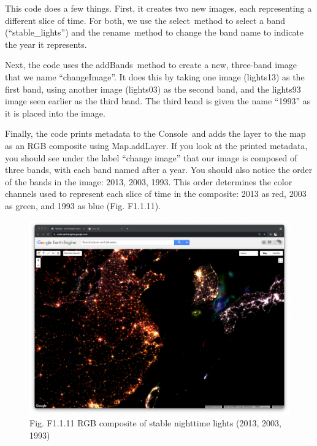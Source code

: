 \documentclass[
  letterpaper,
  DIV=11,
  numbers=noendperiod]{scrreprt}
\begin{document}
This code does a few things. First, it creates two new images, each
representing a different slice of time. For both, we use the
select~method to select a band (``stable\_lights'') and the
rename~method to change the band name to indicate the year it
represents. ~

Next, the code uses the addBands~method to create a new, three-band
image that we name ``changeImage''. It does this by taking one image
(lights13) as the first band, using another image (lights03) as the
second band, and the lights93 image seen earlier as the third band. The
third band is given the name ``1993'' as it is placed into the image.

Finally, the code prints metadata to the Console~and adds the layer to
the map as an RGB composite using Map.addLayer. If you look at the
printed metadata, you should see under the label ``change image'' that
our image is composed of three bands, with each band named after a year.
You should also notice the order of the bands in the image: 2013, 2003,
1993. This order determines the color channels used to represent each
slice of time in the composite: 2013 as red, 2003 as green, and 1993 as
blue (Fig. F1.1.11).

\begin{figure}

{\centering \includegraphics{./F1/image51.png}

}

\caption{Fig. F1.1.11 RGB composite of stable nighttime lights (2013,
2003, 1993)}

\end{figure}
\end{document}
